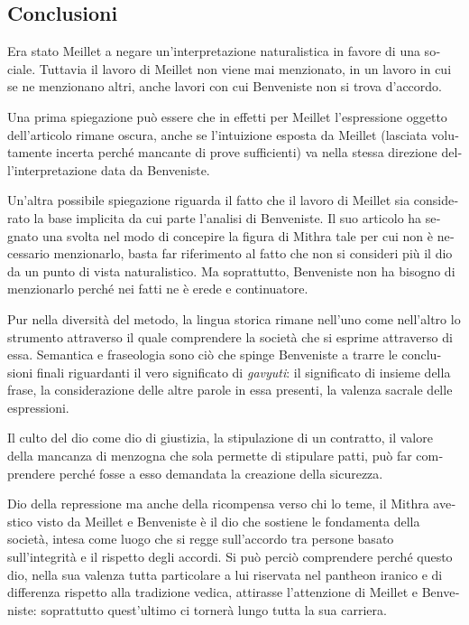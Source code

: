 \documentclass[output=paper]{../langscibook}
\begin{document}
\begin{otherlanguage}{italian}
\section{Conclusioni}

Era stato Meillet a negare un’interpretazione naturalistica in favore di una sociale. Tuttavia il lavoro di Meillet non viene mai menzionato, in un lavoro in cui se ne menzionano altri, anche lavori con cui Benveniste non si trova d’accordo.

Una prima spiegazione può essere che in effetti per Meillet l’espressione oggetto dell’articolo rimane oscura, anche se l’intuizione esposta da Meillet (lasciata volutamente incerta perché mancante di prove sufficienti) va nella stessa direzione dell’interpretazione data da Benveniste.

Un’altra possibile spiegazione riguarda il fatto che il lavoro di Meillet sia considerato la base implicita da cui parte l’analisi di Benveniste. Il suo articolo ha segnato una svolta nel modo di concepire la figura di Mithra tale per cui non è necessario menzionarlo, basta far riferimento al fatto che non si consideri più il dio da un punto di vista naturalistico. Ma soprattutto, Benveniste non ha bisogno di menzionarlo perché nei fatti ne è erede e continuatore.

Pur nella diversità del metodo, la lingua storica rimane nell’uno come nell’altro lo strumento attraverso il quale comprendere la società che si esprime attraverso di essa. Semantica e fraseologia sono ciò che spinge Benveniste a trarre le conclusioni finali riguardanti il vero significato di \textit{gavyuti}: il significato di insieme della frase, la considerazione delle altre parole in essa presenti, la valenza sacrale delle espressioni.

Il culto del dio come dio di giustizia, la stipulazione di un contratto, il valore della mancanza di menzogna che sola permette di stipulare patti, può far comprendere perché fosse a esso demandata la creazione della sicurezza.

Dio della repressione ma anche della ricompensa verso chi lo teme, il Mithra avestico visto da Meillet e Benveniste è il dio che sostiene le fondamenta della società, intesa come luogo che si regge sull’accordo tra persone basato sull’integrità e il rispetto degli accordi. Si può perciò comprendere perché questo dio, nella sua valenza tutta particolare a lui riservata nel pantheon iranico e di differenza rispetto alla tradizione vedica, attirasse l’attenzione di Meillet e Benveniste: soprattutto quest’ultimo ci tornerà lungo tutta la sua carriera.


\end{otherlanguage}
\end{document}
